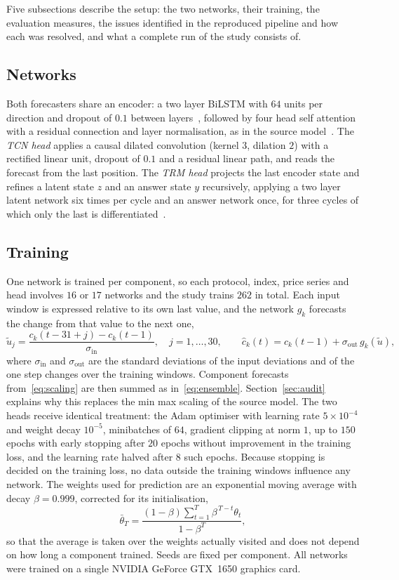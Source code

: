 \documentclass[pdflatex,sn-mathphys-num]{sn-jnl}%
\theoremstyle{thmstyleone}%
\theoremstyle{thmstyletwo}%
\theoremstyle{thmstylethree}%
\begin{document}
Five subsections describe the setup: the two networks, their training, the
evaluation measures, the issues identified in the reproduced pipeline and how
each was resolved, and what a complete run of the study consists of.

\subsection{Networks}
Both forecasters share an encoder: a two layer BiLSTM with $64$ units per
direction and dropout of $0.1$ between layers~\cite{rnnreview2024}, followed by
four head self attention with a residual connection and layer normalisation,
as in the source model~\cite{gong2024}. The \emph{TCN head} applies a causal
dilated convolution (kernel $3$, dilation $2$) with a rectified linear unit,
dropout of $0.1$ and a residual linear path, and reads the forecast from the
last position. The \emph{TRM head} projects the last encoder state and refines
a latent state $z$ and an answer state $y$ recursively, applying a two layer
latent network six times per cycle and an answer network once, for three
cycles of which only the last is differentiated~\cite{jolicoeur2025}.

\subsection{Training}
One network is trained per component, so each protocol, index, price series
and head involves $16$ or $17$ networks and the study trains $262$ in total.
Each input window is expressed relative to its own last value, and the network
$g_k$ forecasts the change from that value to the next one,
\begin{equation}
\tilde{u}_j=\frac{c_k(t-31+j)-c_k(t-1)}{\sigma_{\mathrm{in}}},\quad j=1,\dots,30,
\qquad
\hat{c}_k(t)=c_k(t-1)+\sigma_{\mathrm{out}}\,g_k(\tilde{u}),
\label{eq:scaling}
\end{equation}
where $\sigma_{\mathrm{in}}$ and $\sigma_{\mathrm{out}}$ are the standard
deviations of the input deviations and of the one step changes over the
training windows. Component forecasts from~\eqref{eq:scaling} are then summed
as in~\eqref{eq:ensemble}. Section~\ref{sec:audit} explains why this replaces
the min max scaling of the source model. The two heads receive identical
treatment: the Adam optimiser with learning rate $5\times10^{-4}$ and weight
decay $10^{-5}$, minibatches of $64$, gradient clipping at norm $1$, up to
$150$ epochs with early stopping after $20$ epochs without improvement in the
training loss, and the learning rate halved after $8$ such epochs. Because
stopping is decided on the training loss, no data outside the training windows
influence any network. The weights used for prediction are an exponential
moving average with decay $\beta=0.999$, corrected for its initialisation,
\begin{equation}
\bar{\theta}_T=\frac{(1-\beta)\sum_{t=1}^{T}\beta^{\,T-t}\theta_t}{1-\beta^{T}},
\label{eq:ema}
\end{equation}
so that the average is taken over the weights actually visited and does not
depend on how long a component trained. Seeds are fixed per component. All
networks were trained on a single NVIDIA GeForce GTX~1650 graphics card.
\end{document}
